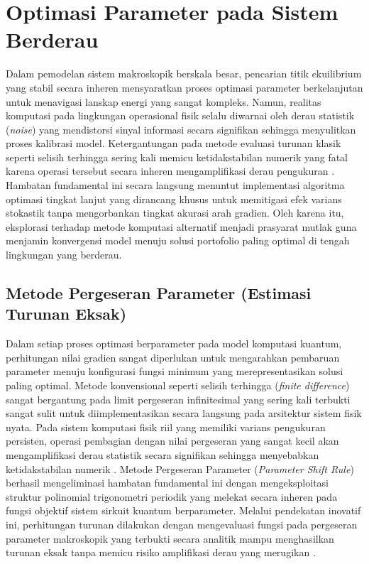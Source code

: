 \section{Optimasi Parameter pada Sistem Berderau}
Dalam pemodelan sistem makroskopik berskala besar, pencarian titik ekuilibrium yang stabil secara inheren mensyaratkan proses optimasi parameter berkelanjutan untuk menavigasi lanskap energi yang sangat kompleks. Namun, realitas komputasi pada lingkungan operasional fisik selalu diwarnai oleh derau statistik (\textit{noise}) yang mendistorsi sinyal informasi secara signifikan sehingga menyulitkan proses kalibrasi model. Ketergantungan pada metode evaluasi turunan klasik seperti selisih terhingga sering kali memicu ketidakstabilan numerik yang fatal karena operasi tersebut secara inheren mengamplifikasi derau pengukuran \cite{spall_implementation_1998}. Hambatan fundamental ini secara langsung menuntut implementasi algoritma optimasi tingkat lanjut yang dirancang khusus untuk memitigasi efek varians stokastik tanpa mengorbankan tingkat akurasi arah gradien. Oleh karena itu, eksplorasi terhadap metode komputasi alternatif menjadi prasyarat mutlak guna menjamin konvergensi model menuju solusi portofolio paling optimal di tengah lingkungan yang berderau.

\subsection{Metode Pergeseran Parameter (Estimasi Turunan Eksak)}
Dalam setiap proses optimasi berparameter pada model komputasi kuantum, perhitungan nilai gradien sangat diperlukan untuk mengarahkan pembaruan parameter menuju konfigurasi fungsi minimum yang merepresentasikan solusi paling optimal. Metode konvensional seperti selisih terhingga (\textit{finite difference}) sangat bergantung pada limit pergeseran infinitesimal yang sering kali terbukti sangat sulit untuk diimplementasikan secara langsung pada arsitektur sistem fisik nyata. Pada sistem komputasi fisik riil yang memiliki varians pengukuran persisten, operasi pembagian dengan nilai pergeseran yang sangat kecil akan mengamplifikasi derau statistik secara signifikan sehingga menyebabkan ketidakstabilan numerik \cite{wierichs_general_2022}. Metode Pergeseran Parameter (\textit{Parameter Shift Rule}) berhasil mengeliminasi hambatan fundamental ini dengan mengeksploitasi struktur polinomial trigonometri periodik yang melekat secara inheren pada fungsi objektif sistem sirkuit kuantum berparameter. Melalui pendekatan inovatif ini, perhitungan turunan dilakukan dengan mengevaluasi fungsi pada pergeseran parameter makroskopik yang terbukti secara analitik mampu menghasilkan turunan eksak tanpa memicu risiko amplifikasi derau yang merugikan \cite{mitarai_quantum_2018}.


